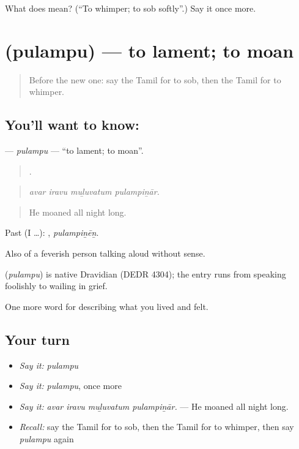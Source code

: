 \begin{tcolorbox}[breakable,colback=teal!4,colframe=teal!35!black,title={Before you move on}]
What does  mean? (\textquotedblleft{}To whimper; to sob softly\textquotedblright{}.) Say it once more.
\end{tcolorbox}
\section[\texorpdfstring{\ta{புலம்பு} (pulampu)}{புலம்பு (pulampu)}]{ (pulampu) — to lament; to moan}

\label{lesson:TA-C458-pulampu}



\begin{quote}
Before the new one: say the Tamil for to sob, then the Tamil for to whimper.
\end{quote}

\subsection*{You'll want to know: }
\textbf{} — \emph{pulampu} — \textquotedblleft{}to lament; to moan\textquotedblright{}.

\begin{quote}
   .
\end{quote}

\begin{quote}
\emph{avar iravu muḻuvatum pulampiṉār.}
\end{quote}

\begin{quote}
He moaned all night long.
\end{quote}

Past (I …): , \emph{pulampiṉēṉ}.

Also of a feverish person talking aloud without sense.

\begin{cousinweb}
\textbf{} (\emph{pulampu}) is native Dravidian (DEDR 4304); the entry runs from speaking foolishly to wailing in grief.
\end{cousinweb}

\begin{grammarlens}[title={What you've built}]
One more word for describing what you lived and felt.
\end{grammarlens}

\subsection*{Your turn}
\begin{itemize}
\raggedright
  \item \emph{Say it:} \emph{pulampu}
  \item \emph{Say it:} \emph{pulampu}, once more
  \item \emph{Say it:} \emph{avar iravu muḻuvatum pulampiṉār.} — He moaned all night long.
  \item \emph{Recall:} say the Tamil for to sob, then the Tamil for to whimper, then say \emph{pulampu} again
\end{itemize}

